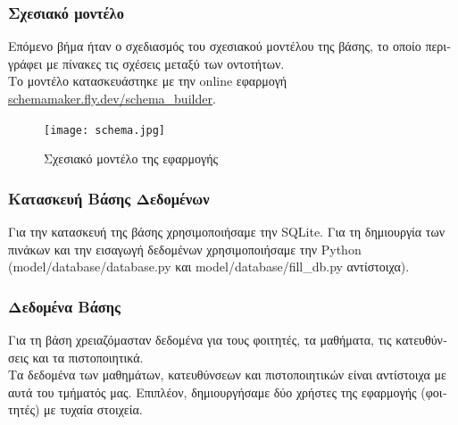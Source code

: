 \documentclass[manuscript,screen,review]{acmart}
\newcommand{\gr}[1]{\foreignlanguage{greek}{#1}}
\begin{document}
\subsubsection{\gr{Σχεσιακό μοντέλο}}

\gr{Επόμενο βήμα ήταν ο σχεδιασμός του σχεσιακού μοντέλου της βάσης, το οποίο περιγράφει με πίνακες τις σχέσεις μεταξύ των οντοτήτων. }
\\\gr{Το μοντέλο κατασκευάστηκε με την} online \gr{εφαρμογή} \href{schemamaker.fly.dev/schema\_builder}{schemamaker.fly.dev/schema\_builder}.

\begin{figure}[H]
    \centering
    \texttt{[image: schema.jpg]}
    \caption{\gr{Σχεσιακό μοντέλο της εφαρμογής}}
    \label{fig:enter-label}
\end{figure}

\subsubsection{\gr{Κατασκευή Βάσης Δεδομένων}}
\gr{Για την κατασκευή της βάσης χρησιμοποιήσαμε την} SQLite. \gr{Για τη δημιουργία των πινάκων και την εισαγωγή δεδομένων χρησιμοποιήσαμε την} Python (model/database/database.py \gr{και} model/database/fill\_db.py \gr{αντίστοιχα}).

\subsubsection{\gr{Δεδομένα Βάσης}}
\gr{Για τη βάση χρειαζόμασταν δεδομένα για τους φοιτητές, τα μαθήματα, τις κατευθύνσεις και τα πιστοποιητικά.} \\\gr{Τα δεδομένα των μαθημάτων, κατευθύνσεων και πιστοποιητικών είναι αντίστοιχα με αυτά του τμήματός μας. Επιπλέον, δημιουργήσαμε δύο χρήστες της εφαρμογής (φοιτητές) με τυχαία στοιχεία.}
\end{document}
